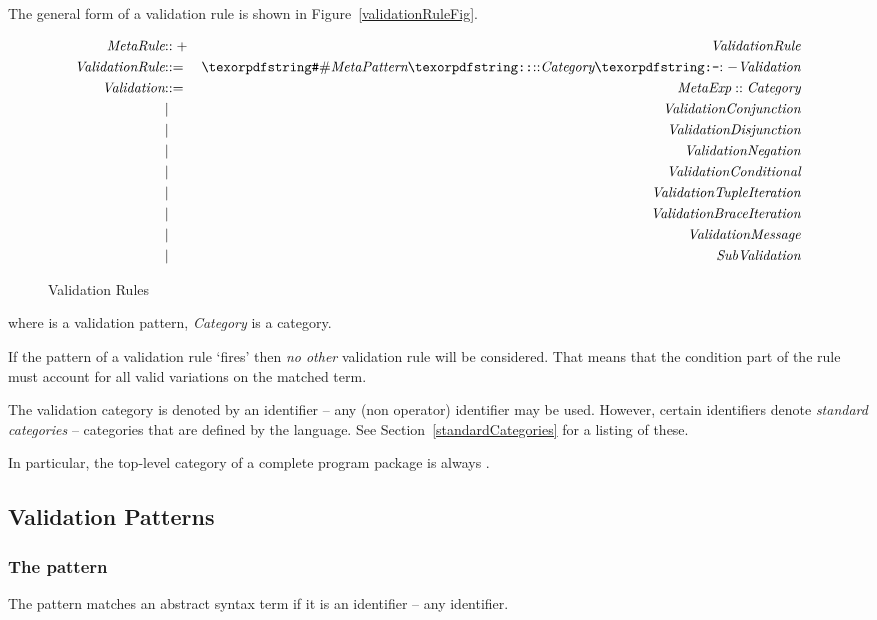 The general form of a validation rule is shown in Figure~\vref{validationRuleFig}.
\begin{figure}[htbp]
\begin{eqnarray*}
\emph{MetaRule}&\arrowplus&\emph{ValidationRule}\\
\emph{ValidationRule}&\arrow&\q{\#} \emph{MetaPattern} \q{::} \emph{Category} \q{:-} \emph{Validation}\\
\emph{Validation}&\arrow&\emph{MetaExp} :: \emph{Category}\\
&\choice&\emph{ValidationConjunction}\\
&\choice&\emph{ValidationDisjunction}\\
&\choice&\emph{ValidationNegation}\\
&\choice&\emph{ValidationConditional}\\
&\choice&\emph{ValidationTupleIteration}\\
&\choice&\emph{ValidationBraceIteration}\\
&\choice&\emph{ValidationMessage}\\
&\choice&\emph{SubValidation}\\
\end{eqnarray*}
\caption{Validation Rules}
\label{validationRulesFig}
\end{figure}
where  is a validation pattern, \emph{Category} is a category.

\begin{aside}
If the pattern of a validation rule `fires' then \emph{no other} validation rule will be considered. That means that the condition part of the rule must account for all valid variations on the matched term.
\end{aside}

The validation category is denoted by an identifier -- any (non operator) identifier may be used. However, certain identifiers denote \emph{standard categories} -- categories that are defined by the language. See Section~\vref{standardCategories} for a listing of these.

In particular, the top-level category of a complete program package is always .

\subsection{Validation Patterns}

\subsubsection{The  pattern}
The pattern  matches an abstract syntax term if it is an identifier -- any identifier.

